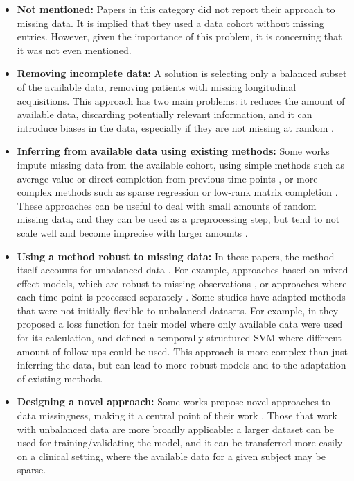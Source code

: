 \begin{itemize}\itemsep7pt

\item \textbf{Not mentioned:} Papers in this category did not report their approach to missing data. It is implied that they used a data cohort without missing entries. However, given the importance of this problem, it is concerning that it was not even mentioned.

\item \textbf{Removing incomplete data:} A solution is selecting only a balanced subset of the available data, removing patients with missing longitudinal acquisitions. This approach has two main problems: it reduces the amount of available data, discarding potentially relevant information, and it can introduce biases in the data, especially if they are not missing at random \cite{Lo2012}.

\item \textbf{Inferring from available data using existing methods:} Some works impute missing data from the available cohort, using simple methods such as average value \cite{Zhou2013a} or direct completion from previous time points \cite{Adhikari2019,Huang2016b}, or more complex methods such as sparse regression \cite{Huang2016c} or low-rank matrix completion \cite{Thung2016}. These approaches can be useful to deal with small amounts of random missing data, and they can be used as a preprocessing step, but tend to not scale well and become imprecise with larger amounts \cite{Ibrahim}. 

\item \textbf{Using a method robust to missing data:} In these papers, the method itself accounts for unbalanced data \cite{Liu2015b}. For example, approaches based on mixed effect models, which are robust to missing observations \cite{Donohue14,Schmidt-Richberg2015}, or approaches where each time point is processed separately \cite{guerrero}. Some studies have adapted methods that were not initially flexible to unbalanced datasets. For example, in \cite{Adhikari2019} they proposed a loss function for their model where only available data were used for its calculation, and \cite{Zhu2016a} defined a temporally-structured SVM where different amount of follow-ups could be used. This approach is more complex than just inferring the data, but can lead to more robust models and to the adaptation of existing methods. 
\item \textbf{Designing a novel approach:} Some works propose novel approaches to data missingness, making it a central point of their work \cite{Dawson2016,Ghazi2019,Goyal2018,Jie2017,Zhu2018}. Those that work with unbalanced data are more broadly applicable: a larger dataset can be used for training/validating the model, and it can be transferred more easily on a clinical setting, where the available data for a given subject may be sparse.

\end{itemize}

